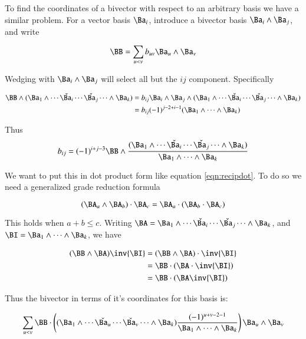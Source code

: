 \documentclass{article}      %
\begin{document}
To find the coordinates of a bivector with respect to an arbitrary basis we have a similar problem.
For a vector basis ${\Ba_i}$, introduce a bivector basis ${\Ba_i \wedge \Ba_j}$, and write

\begin{equation}\label{eqn:bivectorcoord}
\BB = \sum_{u<v} b_{uv} \Ba_u \wedge \Ba_v
\end{equation}

Wedging with $\Ba_i \wedge \Ba_j$ will select all but the $ij$ component.  Specifically

\begin{align*}
\BB \wedge 
(\Ba_1 \wedge \cdots \check{\Ba_i} \cdots \check{\Ba_j} \cdots \wedge \Ba_k) 
&= b_{ij} \Ba_i \wedge \Ba_j \wedge (\Ba_1 \wedge \cdots \check{\Ba_i} \cdots \check{\Ba_j} \cdots \wedge \Ba_k)  \\
&= b_{ij} (-1)^{j-2 + i-1}(\Ba_1 \wedge \cdots \wedge \Ba_k) \\
\end{align*}

Thus 
\begin{equation}\label{eqn:bivectorrecip}
b_{ij} = (-1)^{i+j-3}\BB \wedge
\frac{ (\Ba_1 \wedge \cdots \check{\Ba_i} \cdots \check{\Ba_j} \cdots \wedge \Ba_k) }
{\Ba_1 \wedge \cdots \wedge \Ba_k}
\end{equation}

We want to put this in dot product form like equation \ref{eqn:recipdot}.  To do so we need a generalized grade reduction formula

\begin{equation}\label{eqn:gradereduction}
(\BA_a \wedge \BA_b) \cdot \BA_c = \BA_a \cdot (\BA_b \cdot \BA_c)
\end{equation}

This holds when $a + b \le c$.  Writing 
$\BA = \Ba_1 \wedge \cdots \check{\Ba_i} \cdots \check{\Ba_j} \cdots \wedge \Ba_k$, and
$\BI = \Ba_1 \wedge \cdots \wedge \Ba_k$, we have

\begin{align*}
(\BB \wedge \BA) \inv{\BI}
&= (\BB \wedge \BA) \cdot \inv{\BI} \\
&= \BB \cdot (\BA \cdot \inv{\BI}) \\
&= \BB \cdot (\BA \inv{\BI}) \\
\end{align*}

Thus the bivector in terms of it's coordinates for this basis is:

\begin{equation}\label{eqn:bivectordecomp}
\sum_{u<v} 
\BB \cdot
\left(
(\Ba_1 \wedge \cdots \check{\Ba_u} \cdots \check{\Ba_v} \cdots \wedge \Ba_k)
\frac{(-1)^{u+v-2-1}}
{\Ba_1 \wedge \cdots \wedge \Ba_k}
\right)
\Ba_u \wedge \Ba_v
\end{equation}
\end{document}
